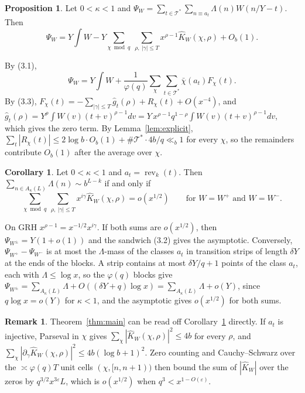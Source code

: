 \documentclass[11pt]{amsart}
\makeatletter
\theoremstyle{definition}
\newtheorem{proposition}[theorem]{Proposition}
\newtheorem{corollary}[theorem]{Corollary}
\newtheorem{remark}[theorem]{Remark}
\numberwithin{equation}{section}
\renewenvironment{proof}[1][\proofname]{\par\pushQED{\qed}\normalfont\topsep6\p@\@plus6\p@\relax\trivlist\item[\hskip\labelsep\upshape#1.]\ignorespaces}{\popQED\endtrivlist\@endpefalse}
\newcommand{\rev}{\operatorname{rev}}
\newcommand{\cT}{\mathcal{T}}
\makeatother
\begin{document}
\begin{proposition}\label{prop:identity}
Let $0<\kappa<1$ and $\Psi_W=\sum_{t\in\cT^*}\sum_{n\equiv a_t}\Lambda(n)W(n/Y-t)$. Then
\[
\Psi_W=Y\!\int W-Y\sum_{\chi\bmod q}\ \sum_{\rho,\ |\gamma|\le T}x^{\rho-1}\hat K_W(\chi,\rho)+O_b(1).
\]
\end{proposition}

\begin{proof}
By (3.1),
\[
\Psi_W=Y\!\int W+\frac1{\varphi(q)}\sum_\chi\sum_{t\in\cT^*}\bar\chi(a_t)F_\chi(t).
\]
By (3.3), $F_\chi(t)=-\sum_{|\gamma|\le T}\hat g_t(\rho)+R_\chi(t)+O(x^{-4})$, and $\hat g_t(\rho)=Y^\rho\int W(v)(t+v)^{\rho-1}dv=Y\,x^{\rho-1}q^{1-\rho}\int W(v)(t+v)^{\rho-1}dv$, which gives the zero term. By Lemma~\ref{lem:explicit}, $\sum_t|R_\chi(t)|\le2\log b\cdot O_b(1)+\#\cT^*\cdot4b/q\ll_b1$ for every $\chi$, so the remainders contribute $O_b(1)$ after the average over $\chi$.
\end{proof}

\begin{corollary}\label{cor:criterion}
Let $0<\kappa<1$ and $a_t=\rev_k(t)$. Then $\sum_{n\in A_\kappa(L)}\Lambda(n)\sim b^{L-k}$ if and only if
\[
\sum_{\chi\bmod q}\ \sum_{\rho,\ |\gamma|\le T}x^{i\gamma}\hat K_W(\chi,\rho)=o(x^{1/2})\qquad\text{for }W=W^+\text{ and }W=W^-.
\]
\end{corollary}

\begin{proof}
On GRH $x^{\rho-1}=x^{-1/2}x^{i\gamma}$. If both sums are $o(x^{1/2})$, then $\Psi_{W^\pm}=Y(1+o(1))$ and the sandwich (3.2) gives the asymptotic. Conversely, $\Psi_{W^+}-\Psi_{W^-}$ is at most the $\Lambda$-mass of the classes $a_t$ in transition strips of length $\delta Y$ at the ends of the blocks. A strip contains at most $\delta Y/q+1$ points of the class $a_t$, each with $\Lambda\le\log x$, so the $\varphi(q)$ blocks give $\Psi_{W^\pm}=\sum_{A_\kappa(L)}\Lambda+O((\delta Y+q)\log x)=\sum_{A_\kappa(L)}\Lambda+o(Y)$, since $q\log x=o(Y)$ for $\kappa<1$, and the asymptotic gives $o(x^{1/2})$ for both sums.
\end{proof}

\begin{remark}\label{rem:parsevalK}
Theorem~\ref{thm:main} can be read off Corollary~\ref{cor:criterion} directly. If $a_t$ is injective, Parseval in $\chi$ gives $\sum_\chi|\hat K_W(\chi,\rho)|^2\le4b$ for every $\rho$, and $\sum_\chi|\partial_\gamma\hat K_W(\chi,\rho)|^2\le4b(\log b+1)^2$. Zero counting and Cauchy--Schwarz over the $\asymp\varphi(q)T$ unit cells $(\chi,[n,n+1))$ then bound the sum of $|\hat K_W|$ over the zeros by $q^{3/2}x^{3\varepsilon}L$, which is $o(x^{1/2})$ when $q^3<x^{1-O(\varepsilon)}$.
\end{remark}
\end{document}
